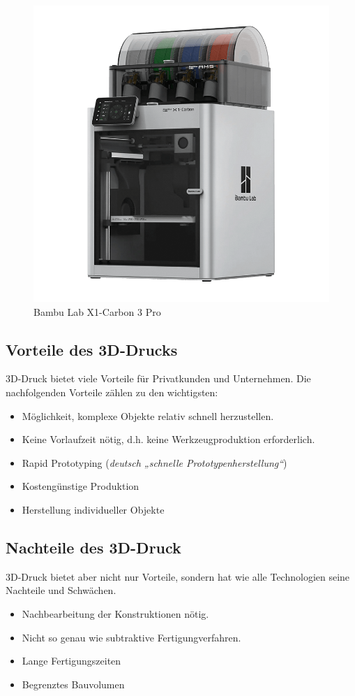 \begin{figure}[H]
	\centering
	\includegraphics[width=0.5\linewidth]{images/3D-Drucker.png}
	\caption[Bambu Lab X1-Carbon 3 Pro]{Bambu Lab X1-Carbon 3 Pro}
	\label{fig:3D-Druck}
\end{figure}


\subsection{Vorteile des 3D-Drucks}
3D-Druck bietet viele Vorteile für Privatkunden und Unternehmen. Die nachfolgenden Vorteile zählen zu den wichtigsten:
\begin{itemize}
	\item Möglichkeit, komplexe Objekte relativ schnell herzustellen.
	\item Keine Vorlaufzeit nötig, d.h. keine Werkzeugproduktion erforderlich.
	\item Rapid Prototyping (\textit{deutsch „schnelle Prototypenherstellung“})
	\item Kostengünstige Produktion
	\item Herstellung individueller Objekte
\end{itemize} \parencite{3DDruckVorteile}

\subsection{Nachteile des 3D-Druck}
3D-Druck bietet aber nicht nur Vorteile, sondern hat wie alle Technologien seine Nachteile und Schwächen.
\begin{itemize}
	\item Nachbearbeitung der Konstruktionen nötig.
	\item Nicht so genau wie subtraktive Fertigungverfahren.
	\item Lange Fertigungszeiten
	\item Begrenztes Bauvolumen
\end{itemize}
\parencite{3DDruckNachteile}

